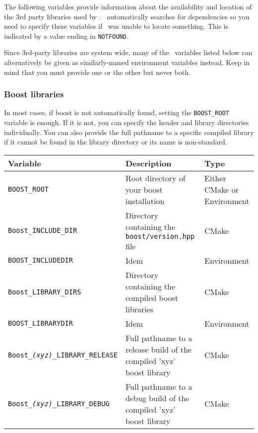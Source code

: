 The following variables provide information about the availability and
location of the 3rd party libraries used by \cgal. \cmake\ automatically
searches for dependencies so you need to specify these variables if \cmake\
was unable to locate something. This is indicated by a value ending in
\texttt{NOTFOUND}.

Since 3rd-party libraries are system wide, many of the \cmake\ variables listed below can alternatively
be given as similarly-named environment variables instead. Keep in mind that you must provide one or the
other but never both.

\subsubsection{Boost libraries}

In most cases, if boost is not automatically found, setting the \texttt{BOOST\_ROOT} 
variable is enough. If it is not, you can specify the header and library
directories individually. You can also provide the full pathname to a specific compiled library
if it cannot be found in the library directory or its name is non-standard.

{\ccTexHtml{\small}{}
\renewcommand{\arraystretch}{1.3}
\gdef\lcTabularBorder{2}
\begin{tabular}{|l|l|l|} \hline
  \textbf{Variable}                             & \textbf{Description}                                                 & \textbf{Type}\\\hline\hline
  \texttt{BOOST\_ROOT}\footnotemark[16]         & Root directory of your boost installation                            & Either CMake or Environment\\\hline
  \texttt{Boost\_INCLUDE\_DIR}                  & Directory containing the \texttt{boost/version.hpp} file             & CMake\\\hline
  \texttt{BOOST\_INCLUDEDIR}                    & Idem                                                                 & Environment\\\hline
  \texttt{Boost\_LIBRARY\_DIRS}                 & Directory containing the compiled boost libraries                    & CMake\\\hline
  \texttt{BOOST\_LIBRARYDIR}                    & Idem                                                                 & Environment\\\hline
  \texttt{Boost\_{\em (xyz)}\_LIBRARY\_RELEASE} & Full pathname to a release build of the compiled 'xyz' boost library & CMake\\\hline
  \texttt{Boost\_{\em (xyz)}\_LIBRARY\_DEBUG}   & Full pathname to a debug build of the compiled 'xyz' boost library   & CMake\\\hline
\end{tabular}
}
\addtocounter{footnote}{1}

